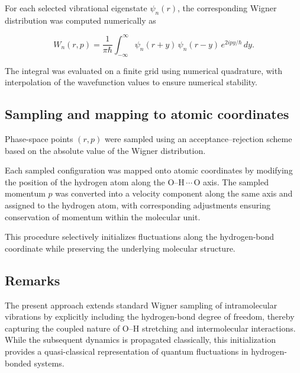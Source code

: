 \documentclass[12pt]{article}
\begin{document}
For each selected vibrational eigenstate $\psi_n(r)$, the corresponding
Wigner distribution was computed numerically as

\[
	W_n(r,p) =
	\frac{1}{\pi \hbar}
	\int_{-\infty}^{\infty}
	\psi_n(r+y)\,\psi_n(r-y)\,
	e^{2 i p y / \hbar} \, dy.
\]

The integral was evaluated on a finite grid using numerical quadrature,
with interpolation of the wavefunction values to ensure numerical stability.

\subsection*{Sampling and mapping to atomic coordinates}

Phase-space points $(r,p)$ were sampled using an acceptance--rejection
scheme based on the absolute value of the Wigner distribution.

Each sampled configuration was mapped onto atomic coordinates by modifying
the position of the hydrogen atom along the O--H\,$\cdots$\,O axis. The
sampled momentum $p$ was converted into a velocity component along the same
axis and assigned to the hydrogen atom, with corresponding adjustments
ensuring conservation of momentum within the molecular unit.

This procedure selectively initializes fluctuations along the
hydrogen-bond coordinate while preserving the underlying molecular
structure.

\subsection*{Remarks}

The present approach extends standard Wigner sampling of intramolecular
vibrations by explicitly including the hydrogen-bond degree of freedom,
thereby capturing the coupled nature of O--H stretching and intermolecular
interactions. While the subsequent dynamics is propagated classically, this
initialization provides a quasi-classical representation of quantum
fluctuations in hydrogen-bonded systems.
\end{document}
